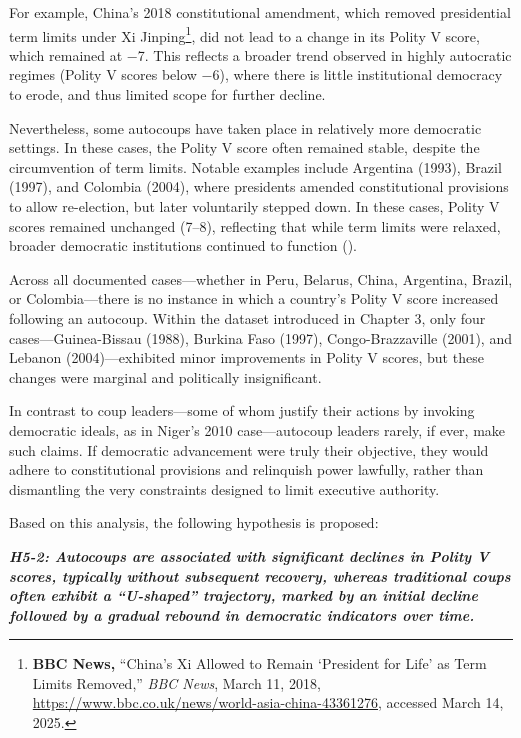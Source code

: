 \documentclass[
  12pt,
]{report}
\begin{document}
For example, China's 2018 constitutional amendment, which removed
presidential term limits under Xi Jinping\footnote{\textbf{BBC News,}
  ``China's Xi Allowed to Remain `President for Life' as Term Limits
  Removed,'' \emph{BBC News}, March 11, 2018,
  \url{https://www.bbc.co.uk/news/world-asia-china-43361276}, accessed
  March 14, 2025.}, did not lead to a change in its Polity V score,
which remained at −7. This reflects a broader trend observed in highly
autocratic regimes (Polity V scores below −6), where there is little
institutional democracy to erode, and thus limited scope for further
decline.

Nevertheless, some autocoups have taken place in relatively more
democratic settings. In these cases, the Polity V score often remained
stable, despite the circumvention of term limits. Notable examples
include Argentina (1993), Brazil (1997), and Colombia (2004), where
presidents amended constitutional provisions to allow re-election, but
later voluntarily stepped down. In these cases, Polity V scores remained
unchanged (7--8), reflecting that while term limits were relaxed,
broader democratic institutions continued to function
().

Across all documented cases---whether in Peru, Belarus, China,
Argentina, Brazil, or Colombia---there is no instance in which a
country's Polity V score increased following an autocoup. Within the
dataset introduced in Chapter 3, only four cases---Guinea-Bissau (1988),
Burkina Faso (1997), Congo-Brazzaville (2001), and Lebanon
(2004)---exhibited minor improvements in Polity V scores, but these
changes were marginal and politically insignificant.

In contrast to coup leaders---some of whom justify their actions by
invoking democratic ideals, as in Niger's 2010 case---autocoup leaders
rarely, if ever, make such claims. If democratic advancement were truly
their objective, they would adhere to constitutional provisions and
relinquish power lawfully, rather than dismantling the very constraints
designed to limit executive authority.

Based on this analysis, the following hypothesis is proposed:

\textbf{\emph{H5-2: Autocoups are associated with significant declines
in Polity V scores, typically without subsequent recovery, whereas
traditional coups often exhibit a ``U-shaped'' trajectory, marked by an
initial decline followed by a gradual rebound in democratic indicators
over time.}}
\end{document}
